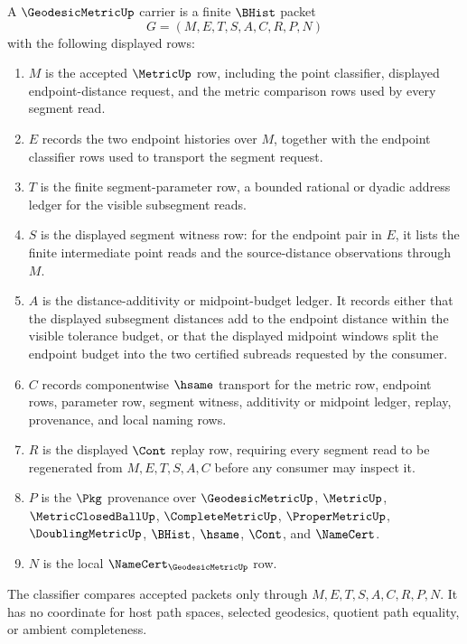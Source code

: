 \begin{definition}
\label{def:geodesic-metric-carrier}
A $\GeodesicMetricUp$ carrier is a finite $\BHist$ packet
$$
G=(M,E,T,S,A,C,R,P,N)
$$
with the following displayed rows:
\begin{enumerate}
\item $M$ is the accepted $\MetricUp$ row, including the point classifier, displayed endpoint-distance request, and the metric comparison rows used by every segment read.
\item $E$ records the two endpoint histories over $M$, together with the endpoint classifier rows used to transport the segment request.
\item $T$ is the finite segment-parameter row, a bounded rational or dyadic address ledger for the visible subsegment reads.
\item $S$ is the displayed segment witness row: for the endpoint pair in $E$, it lists the finite intermediate point reads and the source-distance observations through $M$.
\item $A$ is the distance-additivity or midpoint-budget ledger. It records either that the displayed subsegment distances add to the endpoint distance within the visible tolerance budget, or that the displayed midpoint windows split the endpoint budget into the two certified subreads requested by the consumer.
\item $C$ records componentwise $\hsame$ transport for the metric row, endpoint rows, parameter row, segment witness, additivity or midpoint ledger, replay, provenance, and local naming rows.
\item $R$ is the displayed $\Cont$ replay row, requiring every segment read to be regenerated from $M,E,T,S,A,C$ before any consumer may inspect it.
\item $P$ is the $\Pkg$ provenance over $\GeodesicMetricUp$, $\MetricUp$, $\MetricClosedBallUp$, $\CompleteMetricUp$, $\ProperMetricUp$, $\DoublingMetricUp$, $\BHist$, $\hsame$, $\Cont$, and $\NameCert$.
\item $N$ is the local $\NameCert_{\GeodesicMetricUp}$ row.
\end{enumerate}
The classifier compares accepted packets only through $M,E,T,S,A,C,R,P,N$. It has no coordinate for host path spaces, selected geodesics, quotient path equality, or ambient completeness.
\end{definition}

